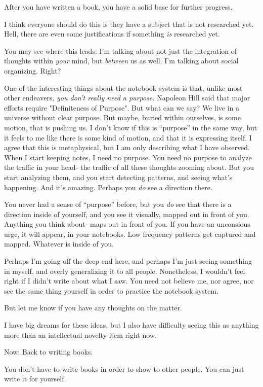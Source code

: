 \documentclass[oneside]{book}
\begin{document}
After you have written a book, you have a solid base for further
progress.

I think everyone should do this is they have a subject that is not
researched yet. Hell, there are even some justifications if something
\emph{is} researched yet.

You may see where this leads: I'm talking about not just the
integration of thoughts within \emph{your} mind, but \emph{between} us as
well. I'm talking about social organizing. Right?

One of the interesting things about the notebook system is that,
unlike most other endeavers, \emph{you don't really need a purpose.}
Napoleon Hill said that major efforts require "Definiteness of
Purpose". But what can we say? We live in a universe without clear
purpose. But maybe, buried within ourselves, is some motion, that is
pushing us. I don't know if this is ``purpose'' in the same way, but it
feels to me like there is some kind of motion, and that it is
expressing itself. I agree that this is metaphysical, but I am only
describing what I have observed. When I start keeping notes, I need no
purpose. You need no purpose to analyze the traffic in your head- the
traffic of all these thoughts zooming about. But you start analyzing
them, and you start detecting patterns, and seeing what's
happening. And it's amazing. Perhaps you \emph{do} see a direction there.

You never had a sense of ``purpose'' before, but you \emph{do} see that there
is a direction inside of yourself, and you see it visually, mapped out
in front of you. Anything you think about- maps out in front of
you. If you have an unconsious urge, it will appear, in your
notebooks. Low frequency patterns get captured and mapped. Whatever is
inside of you.

Perhaps I'm going off the deep end here, and perhaps I'm just seeing
something in myself, and overly generalizing it to all
people. Nonetheless, I wouldn't feel right if I didn't write about
what I saw. You need not believe me, nor agree, nor see the same thing
yourself in order to practice the notebook system.

But let me know if you have any thoughts on the matter.

I have big dreams for these ideas, but I also have difficulty seeing
this as anything more than an intellectual novelty item right now.

Now: Back to writing books.

You don't have to write books in order to show to other people. You
can just write it for yourself.
\end{document}
